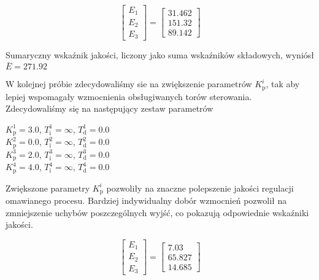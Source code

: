 \[
\begin{bmatrix}
    E_{\mathrm{1}} \\
    E_{\mathrm{2}} \\
    E_{\mathrm{3}} 
\end{bmatrix}
= 
\begin{bmatrix}
    \num{31.462} \\
    \num{151.32} \\
    \num{89.142}
\end{bmatrix}
\]

Sumaryczny wskaźnik jakości, liczony jako suma wskaźników składowych, 
wyniósł $\bar{E} = \num{271.92}$\\

\vspace{2cm}

W kolejnej próbie zdecydowaliśmy sie na zwiększenie parametrów $K^{i}_{\mathrm{p}}$, tak aby
lepiej wspomagały wzmocnienia obsługiwanych torów sterowania. Zdecydowaliśmy się na następujący
zestaw parametrów 

\begin{center}
    $K^{\num{1}}_{\mathrm{p}} = \num{3.0}$, $T^{\num{1}}_{\mathrm{i}} = \infty$, $T^{\num{1}}_{\mathrm{d}} = \num{0.0}$ \\
    $K^{\num{2}}_{\mathrm{p}} = \num{0.0}$, $T^{\num{2}}_{\mathrm{i}} = \infty$, $T^{\num{2}}_{\mathrm{d}} = \num{0.0}$ \\
    $K^{\num{3}}_{\mathrm{p}} = \num{2.0}$, $T^{\num{3}}_{\mathrm{i}} = \infty$, $T^{\num{3}}_{\mathrm{d}} = \num{0.0}$ \\
    $K^{\num{4}}_{\mathrm{p}} = \num{4.0}$, $T^{\num{4}}_{\mathrm{i}} = \infty$, $T^{\num{4}}_{\mathrm{d}} = \num{0.0}$ \\
\end{center}

Zwiększone parametry $K^{i}_{\mathrm{p}}$ pozwoliły na znaczne polepszenie jakości regulacji
omawianego procesu. Bardziej indywidualny dobór wzmocnień pozwolił na zmniejszenie uchybów 
poszczególnych wyjść, co pokazują odpowiednie wskaźniki jakości. 

\[
\begin{bmatrix}
    E_{\mathrm{1}} \\
    E_{\mathrm{2}} \\
    E_{\mathrm{3}} 
\end{bmatrix}
= 
\begin{bmatrix}
    \num{7.03} \\
    \num{65.827} \\
    \num{14.685}
\end{bmatrix}
\]

